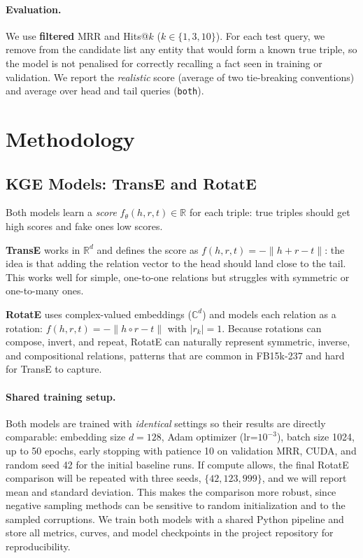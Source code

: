 \documentclass{llncs}
\begin{document}
\paragraph{Evaluation.}
We use \textbf{filtered} MRR and Hits@$k$ ($k\in\{1,3,10\}$).
For each test query, we remove from the candidate list any entity that
would form a known true triple, so the model is not penalised for
correctly recalling a fact seen in training or validation.
We report the \emph{realistic} score (average of two tie-breaking
conventions) and average over head and tail queries (\texttt{both}).

\section{Methodology}

\subsection{KGE Models: TransE and RotatE}

Both models learn a \emph{score} $f_\theta(h,r,t)\in\mathbb{R}$ for each
triple: true triples should get high scores and fake ones low scores.

\textbf{TransE} works in $\mathbb{R}^d$ and
defines the score as $f(h,r,t)=-\|h+r-t\|$: the idea is that adding the
relation vector to the head should land close to the tail.
This works well for simple, one-to-one relations but struggles with
symmetric or one-to-many ones.

\textbf{RotatE} uses complex-valued embeddings
($\mathbb{C}^d$) and models each relation as a rotation: $f(h,r,t)=-\|h
\circ r - t\|$ with $|r_k|=1$.
Because rotations can compose, invert, and repeat, RotatE can naturally
represent symmetric, inverse, and compositional relations, patterns that
are common in FB15k-237 and hard for TransE to capture.

\paragraph{Shared training setup.}
Both models are trained with \emph{identical} settings so their results
are directly comparable: embedding size $d=128$, Adam optimizer
(lr=$10^{-3}$), batch size 1024, up to 50 epochs, early stopping with
patience 10 on validation MRR, CUDA, and random seed 42 for the initial
baseline runs.
If compute allows, the final RotatE comparison will be repeated with
three seeds, $\{42,123,999\}$, and we will report mean and standard
deviation.
This makes the comparison more robust, since negative sampling methods can
be sensitive to random initialization and to the sampled corruptions.
We train both models with a shared Python pipeline and store all metrics,
curves, and model checkpoints in the project repository for reproducibility.
\end{document}
